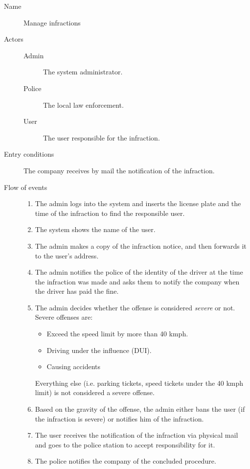 		\begin{description}
			\item[Name] Manage infractions
			\item[Actors] \hfill
				\begin{description}
					\item[Admin] The system administrator.
					\item[Police] The local law enforcement.
					\item[User] The user responsible for the infraction.
				\end{description}
			\item[Entry conditions] The company receives by mail the notification of the infraction.
			\item[Flow of events] \hfill
				\begin{enumerate}
					\item The admin logs into the system and inserts the license plate and the time of the infraction to find the responsible user.
					\item The system shows the name of the user.
					\item The admin makes a copy of the infraction notice, and then forwards it to the user's address.
					\item The admin notifies the police of the identity of the driver at the time the infraction was made and asks them to notify the company when the driver has paid the fine.
					\item The admin decides whether the offense is considered \textit{severe} or not. Severe offenses are:
						\begin{itemize}
							\item Exceed the speed limit by more than 40 kmph.
							\item Driving under the influence (DUI).
							\item Causing accidents %
						\end{itemize}
						Everything else (i.e. parking tickets, speed tickets under the 40 kmph limit) is not considered a severe offense.
					\item Based on the gravity of the offense, the admin either bans the user (if the infraction is severe) or notifies him of the infraction.
					\item The user receives the notification of the infraction via physical mail and goes to the police station to accept responsibility for it.
					\item The police notifies the company of the concluded procedure.

\end{enumerate}
\end{description}
